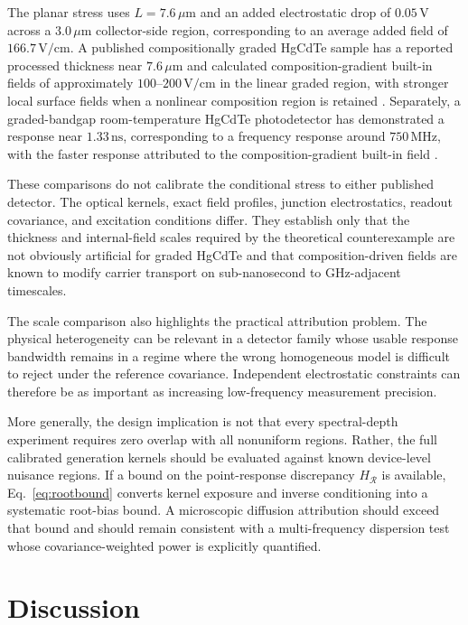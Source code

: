 \documentclass[aps,pra,twocolumn,superscriptaddress,nofootinbib]{revtex4-2}
\newcommand{\Rregion}{\mathcal{R}}
\begin{document}
The planar stress uses $L=7.6\,\mu\mathrm{m}$ and an added electrostatic drop of $0.05\,\mathrm{V}$ across a $3.0\,\mu\mathrm{m}$ collector-side region, corresponding to an average added field of $166.7\,\mathrm{V/cm}$. A published compositionally graded HgCdTe sample has a reported processed thickness near $7.6\,\mu\mathrm{m}$ and calculated composition-gradient built-in fields of approximately $100$--$200\,\mathrm{V/cm}$ in the linear graded region, with stronger local surface fields when a nonlinear composition region is retained \cite{xu2023graded}. Separately, a graded-bandgap room-temperature HgCdTe photodetector has demonstrated a response near $1.33\,\mathrm{ns}$, corresponding to a frequency response around $750\,\mathrm{MHz}$, with the faster response attributed to the composition-gradient built-in field \cite{sang2022graded}.

These comparisons do not calibrate the conditional stress to either published detector. The optical kernels, exact field profiles, junction electrostatics, readout covariance, and excitation conditions differ. They establish only that the thickness and internal-field scales required by the theoretical counterexample are not obviously artificial for graded HgCdTe and that composition-driven fields are known to modify carrier transport on sub-nanosecond to GHz-adjacent timescales.

The scale comparison also highlights the practical attribution problem. The physical heterogeneity can be relevant in a detector family whose usable response bandwidth remains in a regime where the wrong homogeneous model is difficult to reject under the reference covariance. Independent electrostatic constraints can therefore be as important as increasing low-frequency measurement precision.

More generally, the design implication is not that every spectral-depth experiment requires zero overlap with all nonuniform regions. Rather, the full calibrated generation kernels should be evaluated against known device-level nuisance regions. If a bound on the point-response discrepancy $H_{\Rregion}$ is available, Eq.~\eqref{eq:rootbound} converts kernel exposure and inverse conditioning into a systematic root-bias bound. A microscopic diffusion attribution should exceed that bound and should remain consistent with a multi-frequency dispersion test whose covariance-weighted power is explicitly quantified.

\section{Discussion}
\end{document}
